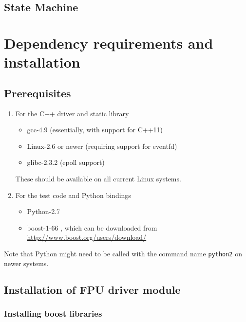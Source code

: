\documentclass{scrartcl}[12pt,a4paper]
\begin{document}
\subsection{State Machine}

\appendix

\section{Dependency requirements and installation}



\subsection{Prerequisites}

\begin{enumerate}
  \item For the C++ driver and static library

    
\begin{itemize}
\item gcc-4.9 (essentially, with support for C++11)
\item Linux-2.6 or newer (requiring support for eventfd)
\item glibc-2.3.2 (epoll support)
\end{itemize}

These should be available on all current Linux systems.

\item For the test code and Python bindings

\begin{itemize}
\item Python-2.7
\item boost-1-66 , which can be downloaded from \url{http://www.boost.org/users/download/}
\end{itemize}
\end{enumerate}


Note that Python might need to be called with the command name
\texttt{python2} on newer systems.

\subsection{Installation of FPU driver module}

\subsubsection{Installing boost libraries}
\end{document}
